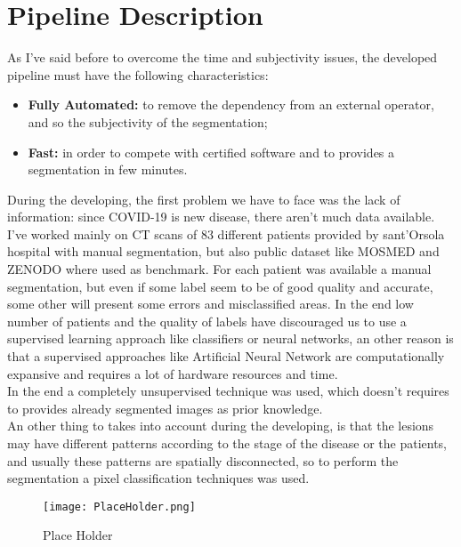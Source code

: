
	
	\section{Pipeline Description}
	
	As I've said before to overcome the time and subjectivity issues, the developed pipeline must have the following characteristics:
	\begin{itemize}
		\item  \textbf{Fully Automated: } to remove the dependency from an external operator, and so the subjectivity of the segmentation; 
		
		\item \textbf{Fast: } in order to compete with certified software and to provides a segmentation in few minutes.
	\end{itemize}

	During the developing, the first problem we have to face was the lack of information: since COVID-19 is new disease, there aren't much data available. I've worked mainly on CT scans of 83 different patients provided by sant'Orsola hospital with manual segmentation, but also public dataset like MOSMED and ZENODO where used as benchmark. For each patient was available a manual segmentation, but even if some label seem to be of good quality and accurate, some other will present some errors and misclassified areas. In the end low number of patients and the quality of labels have discouraged us to use a supervised learning approach like classifiers or neural networks, an other reason is that a supervised approaches like Artificial Neural Network are computationally expansive and requires a lot of hardware resources and time.\\
	In the end a completely unsupervised technique was used, which doesn't requires to provides already segmented images as prior knowledge.\\
	An other thing to takes into account during the developing, is that the lesions may have different patterns according to the stage of the disease or the patients, and usually these patterns are spatially disconnected, so to perform the segmentation a pixel classification techniques was used.
	
	\begin{figure}\label{fig:GGO-Spatial}
		\centering
		\texttt{[image: PlaceHolder.png]}
		\caption{Place Holder}
	\end{figure}
	
